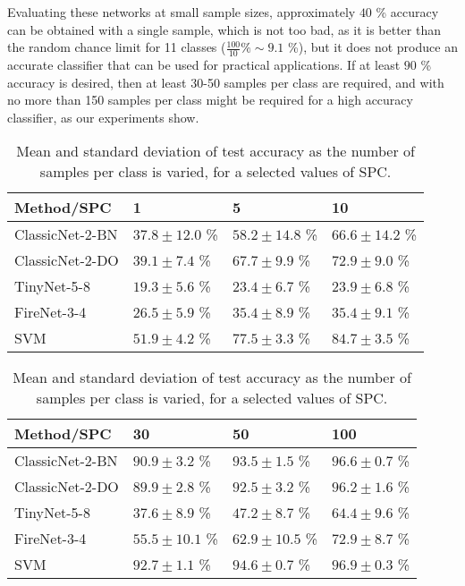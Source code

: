 Evaluating these networks at small sample sizes, approximately $40$ \% accuracy can be obtained with a single sample, which is not too bad, as it is better than the random chance limit for 11 classes ($\frac{100}{10} \% \sim 9.1$ \%), but it does not produce an accurate classifier that can be used for practical applications. If at least $90$ \% accuracy is desired, then at least 30-50 samples per class are required, and with no more than 150 samples per class might be required for a high accuracy classifier, as our experiments show.

\begin{table}[t]
	\forcerectofloat
	\begin{tabular}{llll}
		\hline 
		Method/SPC 		& 1 				   & 5 				    & 10 \\ 
		\hline
		ClassicNet-2-BN & $37.8 \pm 12.0$ \%   & $58.2 \pm 14.8$ \% & $66.6 \pm 14.2$ \%\\
		ClassicNet-2-DO & $39.1 \pm 7.4$ \%    & $67.7 \pm 9.9$ \%  & $72.9 \pm 9.0$ \%\\
		\hline
		TinyNet-5-8 	& $19.3 \pm 5.6$ \%    & $23.4 \pm 6.7$ \%  & $23.9 \pm 6.8$ \%\\
		FireNet-3-4 	& $26.5 \pm 5.9$ \%    & $35.4 \pm 8.9$ \%  & $35.4 \pm 9.1$ \%\\
		\hline
		SVM				& $51.9 \pm 4.2$ \%    & $77.5 \pm 3.3$ \%  & $84.7 \pm 3.5$ \%\\
		\hline 
	\end{tabular}
    \begin{tabular}{llll}
        \hline 
        Method/SPC 		& 30 				  & 50 				& 100\\ 
        \hline
        ClassicNet-2-BN & $90.9 \pm 3.2$ \% & $93.5 \pm 1.5$ \% & $96.6 \pm 0.7$ \%\\
        ClassicNet-2-DO & $89.9 \pm 2.8$ \% & $92.5 \pm 3.2$ \% & $96.2 \pm 1.6$ \%\\
        \hline
        TinyNet-5-8 	& $37.6 \pm 8.9$ \% & $47.2 \pm 8.7$ \% & $64.4 \pm 9.6$ \%\\
        FireNet-3-4 	& $55.5 \pm 10.1$ \% & $62.9 \pm 10.5$ \% & $72.9 \pm 8.7$ \%\\
        \hline
        SVM				& $92.7 \pm 1.1$ \% & $94.6 \pm 0.7$ \% & $96.9 \pm 0.3$ \%\\
        \hline 
    \end{tabular}
	\caption[Mean and standard deviation of test accuracy as the number of samples per class is varied]{Mean and standard deviation of test accuracy as the number of samples per class is varied, for a selected values of SPC.}
	\label{lim:samplesPerClassVsAccuracy}
\end{table}

